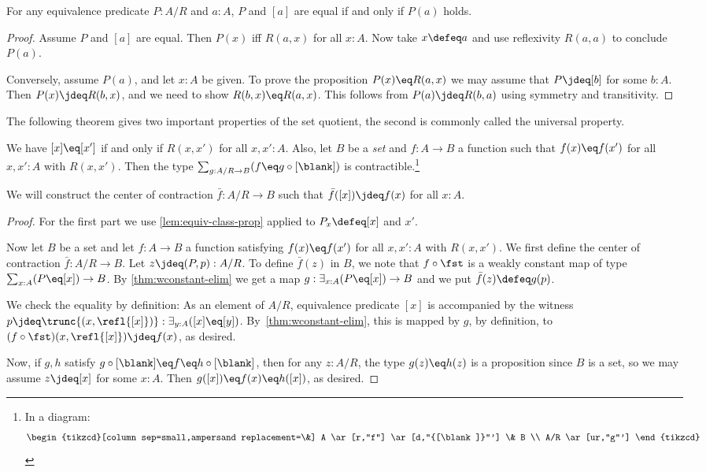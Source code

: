 \begin{lemma}\label{lem:equiv-class-prop}
  For any equivalence predicate $P : A/R$ and $a:A$,
  $P$ and $[a]$ are equal if and only if $P(a)$ holds.
\end{lemma}
\begin{proof}
  Assume $P$ and $[a]$ are equal.
  Then $P(x)$ iff $R(a,x)$ for all $x:A$. Now
  take $x\defeq a$ and use reflexivity $R(a,a)$ to conclude $P(a)$.

  Conversely, assume $P(a)$, and let $x:A$ be given.
  To prove the proposition $P(x) \eq R(a,x)$ we may assume that
  $P \jdeq [b]$ for some $b:A$.
  Then $P(x) \jdeq R(b,x)$, and we need to show $R(b,x) \eq R(a,x)$.
  This follows from $P(a) \jdeq R(b,a)$ using symmetry and transitivity.
\end{proof}

The following theorem gives two important properties of the set quotient,
the second is commonly called the universal property.

\begin{theorem}\label{thm:quotient-property}
  We have $[x] \eq [x']$ if and only if $R(x,x')$ for all $x,x':A$.
  Also, let $B$ be a \emph{set} and $f : A \to B$ a
  function such that $f(x) \eq f(x')$ for all $x,x':A$ with $R(x,x')$.
  Then the type $\sum_{g: A/R \to B} (f \eq g\circ[\blank])$ is
  contractible.\footnote{In a diagram:
  \[\begin{tikzcd}[column sep=small,ampersand replacement=\&]
    A \ar[r,"f"] \ar[d,"{[\blank]}"'] \& B \\
    A/R \ar[ur,"g"']
  \end{tikzcd}\]}
\end{theorem}
We will construct the center of contraction $\bar f : A/R \to B$
such that $\bar f([x]) \jdeq f(x)$ for all $x:A$.
\begin{proof}
  For the first part we use \cref{lem:equiv-class-prop}
  applied to $P_x \defeq [x]$ and $x'$.

  Now let $B$ be a set and let $f : A \to B$ a function
  satisfying $f(x) \eq f(x')$ for all $x,x':A$ with $R(x,x')$.
  We first define the center of contraction $\bar f : A/R \to B$.
  Let $z\jdeq(P,p):A/R$. To define $\bar f(z)$ in $B$,
  we note that $f \circ \fst$ is a weakly constant map
  of type $\sum_{x:A}(P \eq [x]) \to B$. By \cref{thm:wconstant-elim}
  we get a map $g: \exists_{x:A}(P \eq [x]) \to B$ and we put
  $\bar f(z)\defeq g(p)$.

  We check the equality by definition: As an element of $A/R$,
  equivalence predicate $[x]$ is accompanied by the witness
  $p\jdeq \trunc{(x, \refl{[x]})} : \exists_{y:A}([x] \eq [y])$.
  By~\cref{thm:wconstant-elim}, this is mapped by $g$, by definition,
  to $(f \circ \fst)(x, \refl{[x]}) \jdeq f(x)$, as desired.

  Now, if $g,h$ satisfy $g\circ[\blank] \eq f \eq h\circ[\blank]$,
  then for any $z:A/R$, the type $g(z) \eq h(z)$ is a proposition
  since $B$ is a set, so we may assume $z\jdeq [x]$ for some $x:A$.
  Then $g([x]) \eq f(x) \eq h([x])$, as desired.
\end{proof}

